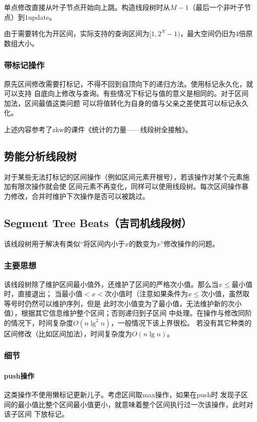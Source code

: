 单点修改直接从叶子节点开始向上跳。构造线段树时从$M-1$（最后一个非叶子节点）到$1$update。

由于需要转化为开区间，实际支持的查询区间为$[1,2^N-1)$，最大空间仍旧为4倍原数组大小。
\subsubsection{带标记操作}
原先区间修改需要打标记，不得不回到自顶向下的递归方法。使用标记永久化，就可以支持
自底向上修改与查询。有些情况下标记与值的意义是相同的。对于区间加法，区间最值这类问题
可以将值转化为自身的值与父亲之差使其可以标记永久化。

上述内容参考了zkw的课件《统计的力量——线段树全接触》。
\subsection{势能分析线段树}
对于某些无法打标记的区间操作（例如区间元素开根号），若该操作对某个元素施加有限次操作就会使
区间元素不再变化，同样可以使用线段树。每次区间操作暴力修改，合并时维护下次操作是否可以被跳过。
\subsection{Segment Tree Beats（吉司机线段树）}
该线段树用于解决有类似``将区间内小于$x$的数变为$x$''修改操作的问题。
\subsubsection{主要思想}

该线段树除了维护区间最小值外，还维护了区间的严格次小值。那么当$x\leq$最小值时，直接退出；
当最小值$<x<$次小值时（注意如果条件为$x\leq$次小值，虽然取等号时仍然可以维护序列，但是
此时次小值变为了最小值，无法维护新的次小值），根据其它信息维护整个区间；否则递归到子区间
中处理。在操作与修改同阶的情况下，时间复杂度$O(n\lg^2 n)$，一般情况下该上界很松。
若没有其它种类的区间修改（比如区间加法），时间复杂度为$O(n\lg n)$。
\subsubsection{细节}
\paragraph{push操作}这类操作不使用懒标记更新儿子。考虑区间取max操作，如果在push时
发现子区间的最小值比整个区间最小值更小，就意味着整个区间执行过一次该操作，此时对该子区间
下放标记。

